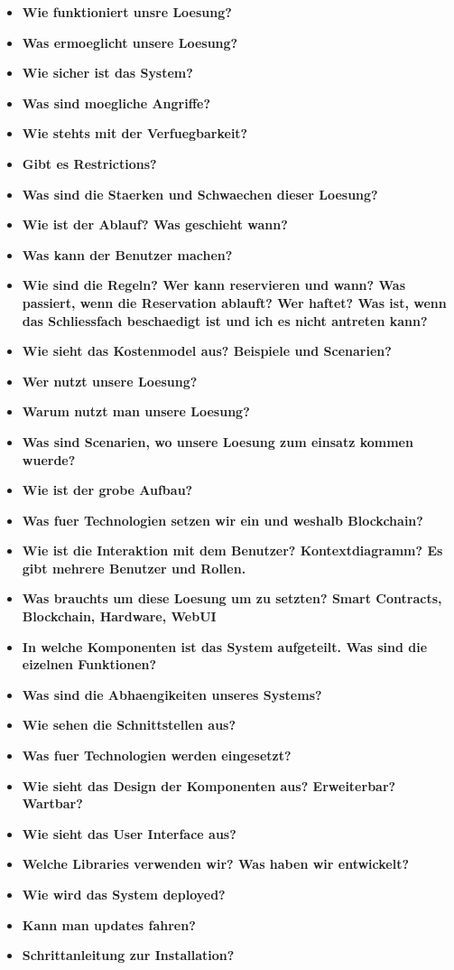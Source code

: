 \begin{itemize}
    \item \textbf{ Wie funktioniert unsre Loesung? }
    \item \textbf{ Was ermoeglicht unsere Loesung? }
    \item \textbf{ Wie sicher ist das System? }
    \item \textbf{ Was sind moegliche Angriffe? }
    \item \textbf{ Wie stehts mit der Verfuegbarkeit?}
    \item \textbf{ Gibt es Restrictions?}
    \item \textbf{ Was sind die Staerken und Schwaechen dieser Loesung? }
    \item \textbf{ Wie ist der Ablauf? Was geschieht wann?}
    \item \textbf{ Was kann der Benutzer machen?}
    \item \textbf{ Wie sind die Regeln? Wer kann reservieren und wann? Was passiert, wenn die Reservation ablauft? Wer haftet? Was ist, wenn das Schliessfach beschaedigt ist und ich es nicht antreten kann?}
    \item \textbf{ Wie sieht das Kostenmodel aus? Beispiele und Scenarien?}
    \item \textbf{ Wer nutzt unsere Loesung? }
    \item \textbf{ Warum nutzt man unsere Loesung?}
    \item \textbf{ Was sind Scenarien, wo unsere Loesung zum einsatz kommen wuerde?}
    \item \textbf{ Wie ist der grobe Aufbau?}
    \item \textbf{ Was fuer Technologien setzen wir ein und weshalb Blockchain?}
    \item \textbf{ Wie ist die Interaktion mit dem Benutzer? Kontextdiagramm? Es gibt mehrere Benutzer und Rollen.}
    \item \textbf{ Was brauchts um diese Loesung um zu setzten? Smart Contracts, Blockchain, Hardware, WebUI }
    \item \textbf{ In welche Komponenten ist das System aufgeteilt. Was sind die eizelnen Funktionen?}
    \item \textbf{ Was sind die Abhaengikeiten unseres Systems?}
    \item \textbf{ Wie sehen die Schnittstellen aus?} 
    \item \textbf{ Was fuer Technologien werden eingesetzt?} 
    \item \textbf{ Wie sieht das Design der Komponenten aus? Erweiterbar? Wartbar?} 
    \item \textbf{ Wie sieht das User Interface aus?} 
    \item \textbf{ Welche Libraries verwenden wir? Was haben wir entwickelt?}
    \item \textbf{ Wie wird das System deployed?}
    \item \textbf{ Kann man updates fahren?}
    \item \textbf{ Schrittanleitung zur Installation?}
\end{itemize}
    
